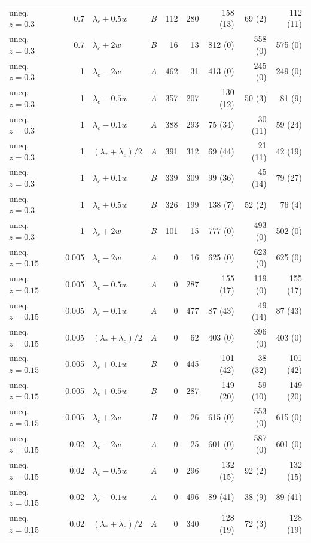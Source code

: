 \begin{longtable}{@{}lrllrrrrr@{}}
uneq. $z{=}0.3$ & 0.7 & $\lambda_c+0.5w$ & $B$ & 112 & 280 & 158 (13) & 69 (2) & 112 (11)\\
uneq. $z{=}0.3$ & 0.7 & $\lambda_c+2w$ & $B$ & 16 & 13 & 812 (0) & 558 (0) & 575 (0)\\
uneq. $z{=}0.3$ & 1 & $\lambda_c-2w$ & $A$ & 462 & 31 & 413 (0) & 245 (0) & 249 (0)\\
uneq. $z{=}0.3$ & 1 & $\lambda_c-0.5w$ & $A$ & 357 & 207 & 130 (12) & 50 (3) & 81 (9)\\
uneq. $z{=}0.3$ & 1 & $\lambda_c-0.1w$ & $A$ & 388 & 293 & 75 (34) & 30 (11) & 59 (24)\\
uneq. $z{=}0.3$ & 1 & $(\lambda_*+\lambda_c)/2$ & $A$ & 391 & 312 & 69 (44) & 21 (11) & 42 (19)\\
uneq. $z{=}0.3$ & 1 & $\lambda_c+0.1w$ & $B$ & 339 & 309 & 99 (36) & 45 (14) & 79 (27)\\
uneq. $z{=}0.3$ & 1 & $\lambda_c+0.5w$ & $B$ & 326 & 199 & 138 (7) & 52 (2) & 76 (4)\\
uneq. $z{=}0.3$ & 1 & $\lambda_c+2w$ & $B$ & 101 & 15 & 777 (0) & 493 (0) & 502 (0)\\
uneq. $z{=}0.15$ & 0.005 & $\lambda_c-2w$ & $A$ & 0 & 16 & 625 (0) & 623 (0) & 625 (0)\\
uneq. $z{=}0.15$ & 0.005 & $\lambda_c-0.5w$ & $A$ & 0 & 287 & 155 (17) & 119 (0) & 155 (17)\\
uneq. $z{=}0.15$ & 0.005 & $\lambda_c-0.1w$ & $A$ & 0 & 477 & 87 (43) & 49 (14) & 87 (43)\\
uneq. $z{=}0.15$ & 0.005 & $(\lambda_*+\lambda_c)/2$ & $A$ & 0 & 62 & 403 (0) & 396 (0) & 403 (0)\\
uneq. $z{=}0.15$ & 0.005 & $\lambda_c+0.1w$ & $B$ & 0 & 445 & 101 (42) & 38 (32) & 101 (42)\\
uneq. $z{=}0.15$ & 0.005 & $\lambda_c+0.5w$ & $B$ & 0 & 287 & 149 (20) & 59 (10) & 149 (20)\\
uneq. $z{=}0.15$ & 0.005 & $\lambda_c+2w$ & $B$ & 0 & 26 & 615 (0) & 553 (0) & 615 (0)\\
uneq. $z{=}0.15$ & 0.02 & $\lambda_c-2w$ & $A$ & 0 & 25 & 601 (0) & 587 (0) & 601 (0)\\
uneq. $z{=}0.15$ & 0.02 & $\lambda_c-0.5w$ & $A$ & 0 & 296 & 132 (15) & 92 (2) & 132 (15)\\
uneq. $z{=}0.15$ & 0.02 & $\lambda_c-0.1w$ & $A$ & 0 & 496 & 89 (41) & 38 (9) & 89 (41)\\
uneq. $z{=}0.15$ & 0.02 & $(\lambda_*+\lambda_c)/2$ & $A$ & 0 & 340 & 128 (19) & 72 (3) & 128 (19)\\

\end{longtable}
